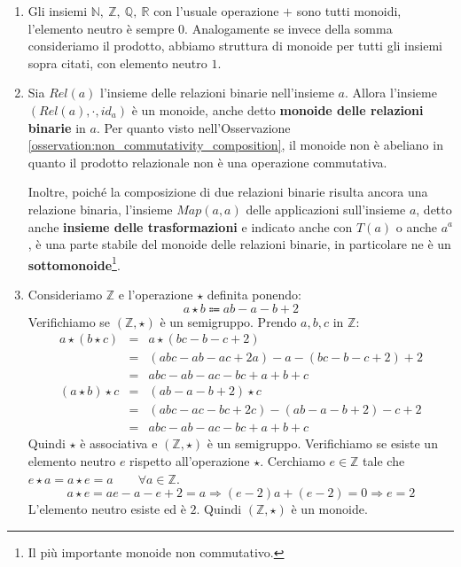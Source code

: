 \begin{example}
\begin{enumerate}
	\item Gli insiemi $\mathbb{N},\ \mathbb{Z}, \ \mathbb{Q},\ \mathbb{R}$ con l'usuale operazione $+$ sono tutti monoidi, l'elemento neutro è sempre $0$. Analogamente se invece della somma consideriamo il prodotto, abbiamo struttura di monoide per tutti gli insiemi sopra citati, con elemento neutro $1$.

	\item Sia $Rel(a)$ l'insieme delle relazioni binarie nell'insieme $a$. Allora l'insieme $(Rel(a), \cdot , id_{a} )$ è un monoide, anche detto \textbf{monoide delle relazioni binarie} in $a$. Per quanto visto nell'Osservazione \ref{osservation:non_commutativity_composition}, il monoide non è abeliano in quanto il prodotto relazionale non è una operazione commutativa.
	\smallskip
	
	Inoltre, poiché la composizione di due relazioni binarie risulta ancora una relazione binaria, l'insieme $Map(a,a)$ delle applicazioni sull'insieme $a$, detto anche \textbf{insieme delle trasformazioni} e indicato anche con $T(a)$ o anche $a^{a}$, è una parte stabile del monoide delle relazioni binarie, in particolare ne è un \textbf{sottomonoide}\footnote{Il più importante monoide non commutativo.}.

	\item Consideriamo $\mathbb{Z}$ e l'operazione $\star$ definita ponendo:
	\begin{displaymath}
		a \star b \Coloneqq ab-a-b+2
	\end{displaymath}
	Verifichiamo se $(\mathbb{Z},\star)$ è un semigruppo. Prendo $a,b,c$ in $\mathbb{Z}$:
	\begin{eqnarray*}
		a \star ( b \star c)&=&a \star (bc-b-c+2)\\
		&=&(abc-ab-ac+2a)-a-(bc-b-c+2)+2\\
		&=& abc-ab-ac-bc+a+b+c \\
		(a\star b)\star c &=&(ab-a-b+2) \star c \\
		&=&(abc-ac-bc+2c)-(ab-a-b+2)-c+2\\
		&=&abc-ab-ac-bc+a+b+c
	\end{eqnarray*}
	Quindi $\star$ è associativa e $(\mathbb{Z},\star)$ è un semigruppo. Verifichiamo se esiste un elemento neutro $e$ rispetto all'operazione $\star$. Cerchiamo $e \in \mathbb{Z}$ tale che $e \star a =a \star e=a \qquad \forall a \in \mathbb{Z}$.
	\begin{equation*}
		a \star e = ae-a-e+2=a \Rightarrow (e-2)a+(e-2)=0 \Rightarrow e=2
	\end{equation*}
	L'elemento neutro esiste ed è $2$. Quindi $(\mathbb{Z},\star)$ è un monoide.


\end{enumerate}
\end{example}
